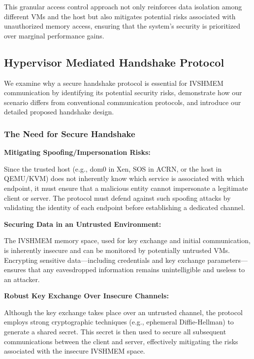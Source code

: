 \documentclass[letterpaper,twocolumn,10pt]{article}
\begin{document}
This granular access control approach not only reinforces data isolation among different VMs and the host but also mitigates potential risks associated with unauthorized memory access, ensuring that the system's security is prioritized over marginal performance gains.



\subsection{Hypervisor Mediated Handshake Protocol}

We examine why a secure handshake protocol is essential for IVSHMEM communication by identifying its potential security risks, demonstrate how our scenario differs from conventional communication protocols, and introduce our detailed proposed handshake design.






\subsubsection{The Need for Secure Handshake}


\textbf{Mitigating Spoofing/Impersonation Risks:}

Since the trusted host (e.g., dom0 in Xen, SOS in ACRN, or the host in QEMU/KVM) does not inherently know which service is associated with which endpoint, it must ensure that a malicious entity cannot impersonate a legitimate client or server. The protocol must defend against such spoofing attacks by validating the identity of each endpoint before establishing a dedicated channel.
    
\textbf{Securing Data in an Untrusted Environment:}

The IVSHMEM memory space, used for key exchange and initial communication, is inherently insecure and can be monitored by potentially untrusted VMs. Encrypting sensitive data—including credentials and key exchange parameters—ensures that any eavesdropped information remains unintelligible and useless to an attacker.
    
\textbf{Robust Key Exchange Over Insecure Channels:}

Although the key exchange takes place over an untrusted channel, the protocol employs strong cryptographic techniques (e.g., ephemeral Diffie-Hellman) to generate a shared secret. This secret is then used to secure all subsequent communications between the client and server, effectively mitigating the risks associated with the insecure IVSHMEM space.
\end{document}
